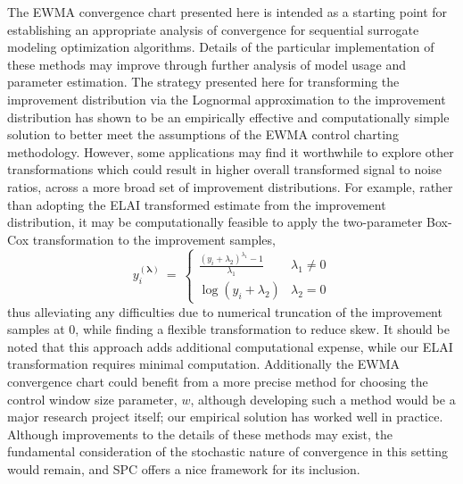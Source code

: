\documentclass[12pt]{article}
\begin{document}
%
The EWMA convergence chart presented here is intended as a starting point for establishing an appropriate analysis of convergence for sequential surrogate modeling optimization algorithms.
Details of the particular implementation of these methods may improve through further analysis of model usage and parameter estimation. 
%
The strategy presented here for transforming the improvement distribution via the Lognormal approximation to the improvement distribution has shown to be an empirically effective and computationally simple solution to better meet the assumptions of the EWMA control charting methodology.
%
However, some applications may find it worthwhile to explore other transformations which could result in higher overall transformed signal to noise ratios, across a more broad set of improvement distributions. %
%
For example, rather than adopting the ELAI transformed estimate from the improvement distribution, it may be computationally feasible to apply the two-parameter Box-Cox transformation \citep{boxCox1964} to the improvement samples,
\begin{equation}
y_i^{(\bm{\lambda})}~=~
\begin{cases}
        \frac{( y_i + \lambda_2 )^{\lambda_1} - 1}{\lambda_1} & \lambda_1\neq0\\
        \log(y_i+\lambda_2) & \lambda_2=0
\end{cases}
\end{equation}
thus alleviating any difficulties due to numerical truncation of the improvement samples at 0, while finding a flexible transformation to reduce skew.
%
It should be noted that this approach adds additional computational expense, while our ELAI transformation requires minimal computation.   
Additionally the EWMA convergence chart could benefit from a more precise method for choosing the control window size parameter, $w$, although developing such a method would be a major research project itself; our empirical solution has worked well in practice.
%
Although improvements to the details of these methods may exist, the fundamental consideration of the stochastic nature of convergence in this setting would remain, and SPC offers a nice framework for its inclusion. %
\end{document}
